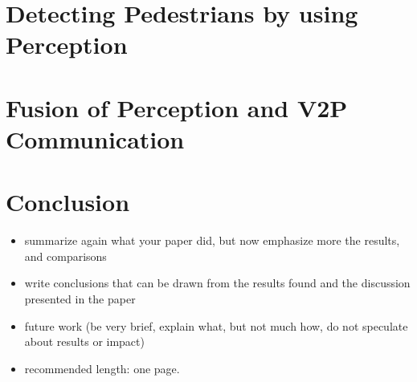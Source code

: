 \documentclass[]{ccs-thesis}
\begin{document}
\chapter{Detecting Pedestrians by using Perception}
\label{chap:perception}


\chapter{Fusion of Perception and V2P Communication}\label{chap:fusion}




\chapter{Conclusion}
\label{chap:conclusion}


\begin{itemize}
\item summarize again what your paper did, but now emphasize more the results, and comparisons
\item write conclusions that can be drawn from the results found and the discussion presented in the paper
\item future work (be very brief, explain what, but not much how, do not speculate about results or impact)
\item recommended length: one page.
\end{itemize}



\cleardoublepage

\listofabbreviations
\clearpage

\listoffigures
\clearpage


\printbibliography
\end{document}

